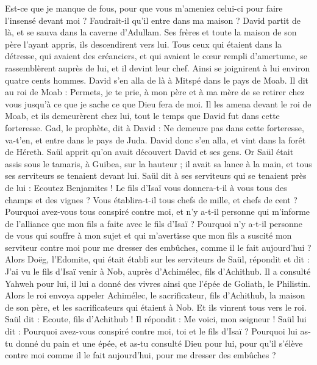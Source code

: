 \begin{multicols}{2}
Est-ce que je manque de fous, pour que vous m'ameniez celui-ci pour faire l'insensé devant moi ? Faudrait-il qu'il entre dans ma maison ?
\VerseOne{}David partit de là, et se sauva dans la caverne d'Adullam. Ses frères et toute la maison de son père l'ayant appris, ils descendirent vers lui.
Tous ceux qui étaient dans la détresse, qui avaient des créanciers, et qui avaient le cœur rempli d'amertume, se rassemblèrent auprès de lui, et il devint leur chef. Ainsi se joignirent à lui environ quatre cents hommes.
David s'en alla de là à Mitspé dans le pays de Moab. Il dit au roi de Moab : Permets, je te prie, à mon père et à ma mère de se retirer chez vous jusqu'à ce que je sache ce que Dieu fera de moi.
Il les amena devant le roi de Moab, et ils demeurèrent chez lui, tout le temps que David fut dans cette forteresse.
Gad, le prophète, dit à David : Ne demeure pas dans cette forteresse, va-t'en, et entre dans le pays de Juda. David donc s'en alla, et vint dans la forêt de Héreth.
Saül apprit qu'on avait découvert David et ses gens. Or Saül était assis sous le tamaris, à Guibea, sur la hauteur ; il avait sa lance à la main, et tous ses serviteurs se tenaient devant lui.
Saül dit à ses serviteurs qui se tenaient près de lui : Ecoutez Benjamites ! Le fils d'Isaï vous donnera-t-il à vous tous des champs et des vignes ? Vous établira-t-il tous chefs de mille, et chefs de cent ?
Pourquoi avez-vous tous conspiré contre moi, et n'y a-t-il personne qui m'informe de l'alliance que mon fils a faite avec le fils d'Isaï ? Pourquoi n'y a-t-il personne de vous qui souffre à mon sujet et qui m'avertisse que mon fils a suscité mon serviteur contre moi pour me dresser des embûches, comme il le fait aujourd'hui ?
Alors Doëg, l'Edomite, qui était établi sur les serviteurs de Saül, répondit et dit : J'ai vu le fils d'Isaï venir à Nob, auprès d'Achimélec, fils d'Achithub.
Il a consulté Yahweh pour lui, il lui a donné des vivres ainsi que l'épée de Goliath, le Philistin.
Alors le roi envoya appeler Achimélec, le sacrificateur, fils d'Achithub, la maison de son père, et les sacrificateurs qui étaient à Nob. Et ils vinrent tous vers le roi.
Saül dit : Ecoute, fils d'Achithub ! Il répondit : Me voici, mon seigneur !
Saül lui dit : Pourquoi avez-vous conspiré contre moi, toi et le fils d'Isaï ? Pourquoi lui as-tu donné du pain et une épée, et as-tu consulté Dieu pour lui, pour qu'il s'élève contre moi comme il le fait aujourd'hui, pour me dresser des embûches ?

\end{multicols}
